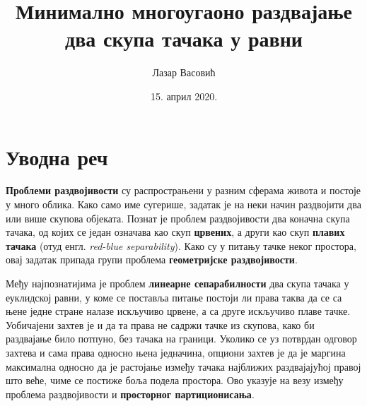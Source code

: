 \documentclass[a4paper]{article}
\begin{document}
\title{Минимално многоугаоно раздвајање два скупа тачака у равни}

\author{Лазар Васовић}

\date{15. април 2020.}

\maketitle


\tableofcontents

\newpage

\section{Уводна реч}

\textbf{Проблеми раздвојивости} су распрострањени у разним сферама живота и постоје у много облика. Како само име сугерише, задатак је на неки начин раздвојити два или више скупова објеката. Познат је проблем раздвојивости два коначна скупа тачака, од којих се један означава као скуп \textbf{црвених}, а други као скуп \textbf{плавих тачака} (отуд енгл. \textit{red-blue separability}). Како су у питању тачке неког простора, овај задатак припада групи проблема \textbf{геометријске раздвојивости}. 

Међу најпознатијима је проблем \textbf{линеарне сепарабилности} два скупа тачака у еуклидској равни, у коме се поставља питање постоји ли права таква да се са њене једне стране налазе искључиво црвене, а са друге искључиво плаве тачке. Уобичајени захтев је и да та права не садржи тачке из скупова, како би раздвајање било потпуно, без тачака на граници. Уколико се уз потврдан одговор захтева и сама права односно њена једначина, опциони захтев је да је маргина максимална односно да је растојање између тачака најближих раздвајајућој правој што веће, чиме се постиже боља подела простора. Ово указује на везу између проблема раздвојивости и \textbf{просторног партиционисања}.
\end{document}
